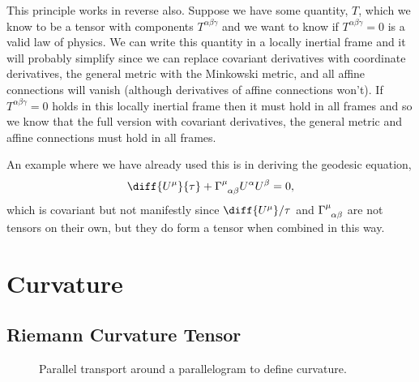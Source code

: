 \documentclass[fleqn]{NotesClass}
\newcommand*{\christoffel}[3]{\tensor{\Gamma}{^{#1}_{{#2}{#3}}}}
\begin{document}
    This principle works in reverse also.
    Suppose we have some quantity, \(T\), which we know to be a tensor with components \(T^{\alpha\beta\gamma}\) and we want to know if \(T^{\alpha\beta\gamma} = 0\) is a valid law of physics.
    We can write this quantity in a locally inertial frame and it will probably simplify since we can replace covariant derivatives with coordinate derivatives, the general metric with the Minkowski metric, and all affine connections will vanish (although derivatives of affine connections won't).
    If \(T^{\alpha\beta\gamma} = 0\) holds in this locally inertial frame then it must hold in all frames and so we know that the full version with covariant derivatives, the general metric and affine connections must hold in all frames.
    
    An example where we have already used this is in deriving the geodesic equation,\vspace{-2.5ex}
    \begin{equation}
        \diff{U^\mu}{\tau} + \christoffel{\mu}{\alpha}{\beta} U^\alpha U^\beta = 0,
    \end{equation}
    which is covariant but not manifestly since \(\diff{U^\mu}/{\tau}\) and \(\christoffel{\mu}{\alpha}{\beta}\) are not tensors on their own, but they do form a tensor when combined in this way.
    
    \chapter{Curvature}
    \section{Riemann Curvature Tensor}
    \begin{figure}
        \caption{Parallel transport around a parallelogram to define curvature.}
        \label{fig:parallel transport}
    \end{figure}
    
\end{document}
